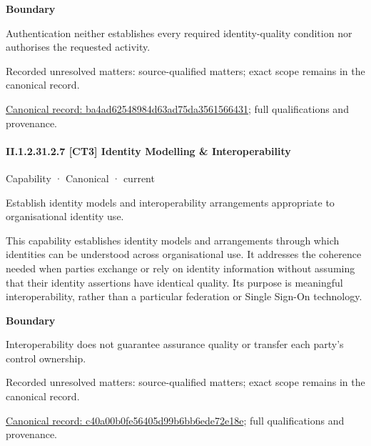 \textbf{Boundary}



Authentication neither establishes every required identity-quality condition nor authorises the requested activity.


{\small Recorded unresolved matters: source-qualified matters; exact scope remains in the canonical record.}\par
{\footnotesize \href{../../../../continuum/strategy/capability/ba4ad62548984d63ad75da3561566431.md}{Canonical record: ba4ad62548984d63ad75da3561566431}; full qualifications and provenance.}\par
\paragraph*{II.1.2.31.2.7 [CT3] Identity Modelling \& Interoperability}
\label{navigation:II.1.2.31.2.7}

\label{element:c40a00b0fe56405d99b6bb6ede72e18e}
{\small Capability · Canonical · current}\par

Establish identity models and interoperability arrangements appropriate to organisational identity use.



This capability establishes identity models and arrangements through which identities can be understood across organisational use. It addresses the coherence needed when parties exchange or rely on identity information without assuming that their identity assertions have identical quality. Its purpose is meaningful interoperability, rather than a particular federation or Single Sign-On technology.



\textbf{Boundary}



Interoperability does not guarantee assurance quality or transfer each party's control ownership.


{\small Recorded unresolved matters: source-qualified matters; exact scope remains in the canonical record.}\par
{\footnotesize \href{../../../../continuum/strategy/capability/c40a00b0fe56405d99b6bb6ede72e18e.md}{Canonical record: c40a00b0fe56405d99b6bb6ede72e18e}; full qualifications and provenance.}\par

